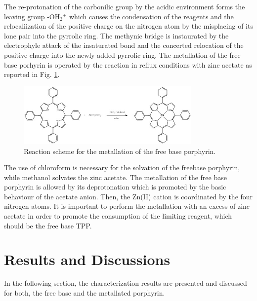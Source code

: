 \documentclass[twoside,twocolumn,9pt]{article}
\begin{document}
The re-protonation of the carbonilic group by the acidic environment forms the leaving group -OH$_{2}$$^{+}$ which causes the condensation of the reagents and the relocaliization of the positive charge on the nitrogen atom by the misplacing of its lone pair into the pyrrolic ring.
The methynic bridge is instaurated by the electrophyle attack of the insaturated bond and the concerted relocation of the positive charge into the newly added pyrrolic ring.
\break
The metallation of the free base porhyrin is operated by the reaction in reflux conditions with zinc acetate as reported in Fig. \ref{metalation}.
\begin{figure}
	\centering
	\includegraphics[width=0.8\textwidth]{Zn-TPP reaction}
	\caption{Reaction scheme for the metallation of the free base porphyrin.}
	\label{metalation}
\end{figure}
The use of chloroform is necessary for the solvation of the freebase porphyrin, while methanol solvates the zinc acetate.
The metallation of the free base porphyrin is allowed by its deprotonation which is promoted by the basic behaviour of the acetate anion.
Then, the Zn(II) cation is coordinated by the four nitrogen atoms.
It is important to perform the metallation with an excess of zinc acetate in order to promote the consumption of the limiting reagent, which should be the free base TPP.\\


\section{Results and Discussions}
In the following section, the characterization results are presented and discussed for both, the free base and the metallated porphyrin.
\end{document}
